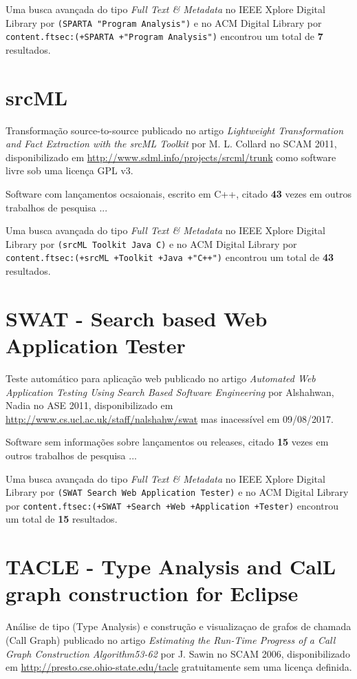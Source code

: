 Uma busca avançada do tipo {\it Full Text \& Metadata} no IEEE Xplore Digital Library por
\texttt{(SPARTA "Program Analysis")}
e no ACM Digital Library por
\texttt{content.ftsec:(+SPARTA +"Program Analysis")}
encontrou um total de
{\bf 7}
resultados.

\section{srcML}

Transformação source-to-source
publicado no artigo {\it Lightweight Transformation and Fact Extraction with the srcML Toolkit}
por M. L. Collard
no SCAM 2011,
disponibilizado em \url{http://www.sdml.info/projects/srcml/trunk}
como software livre
sob uma licença GPL v3.

Software com lançamentos ocsaionais,
escrito em C++,
citado {\bf 43} vezes em outros trabalhos de pesquisa ...

Uma busca avançada do tipo {\it Full Text \& Metadata} no IEEE Xplore Digital Library por
\texttt{(srcML Toolkit Java C)}
e no ACM Digital Library por
\texttt{content.ftsec:(+srcML +Toolkit +Java +"C++")}
encontrou um total de
{\bf 43}
resultados.

\section{SWAT - Search based Web Application Tester}

Teste automático para aplicação web
publicado no artigo {\it Automated Web Application Testing Using Search Based Software Engineering}
por Alshahwan, Nadia
no ASE 2011,
disponibilizado em \url{http://www.cs.ucl.ac.uk/staff/nalshahw/swat}
mas inacessível em 09/08/2017.

Software sem informações sobre lançamentos ou releases,
citado {\bf 15} vezes em outros trabalhos de pesquisa ...

Uma busca avançada do tipo {\it Full Text \& Metadata} no IEEE Xplore Digital Library por
\texttt{(SWAT Search Web Application Tester)}
e no ACM Digital Library por
\texttt{content.ftsec:(+SWAT +Search +Web +Application +Tester)}
encontrou um total de
{\bf 15}
resultados.

\section{TACLE - Type Analysis and CalL graph construction for Eclipse}

Análise de tipo (Type Analysis) e construção e visualizaçao de grafos de chamada (Call Graph)
publicado no artigo {\it Estimating the Run-Time Progress of a Call Graph Construction Algorithm53-62}
por J. Sawin
no SCAM 2006,
disponibilizado em \url{http://presto.cse.ohio-state.edu/tacle}
gratuitamente
sem uma licença definida.

